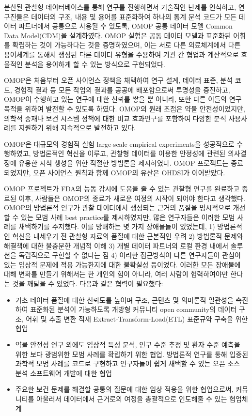 \documentclass[10.5pt]{book}
\providecommand{\tightlist}{%
  \setlength{\itemsep}{0pt}\setlength{\parskip}{0pt}}
\theoremstyle{definition}
\theoremstyle{definition}
\theoremstyle{definition}
\theoremstyle{remark}
\begin{document}
분산된 관찰형 데이터베이스를 통해 연구를 진행하면서 기술적인 난제를
인식하고, 연구진들은 데이터의 구조, 내용 및 용어를 표준화하여 하나의
통계 분석 코드가 모든 데이터 파트너에서 공통으로 사용될 수 있도록, OMOP
공통 데이터 모델 Common Data Model(CDM)을 설계하였다.
\citep{overhage2012cdm} OMOP 실험은 공통 데이터 모델과 표준화된 어휘를
확립하는 것이 가능하다는 것을 증명하였으며, 이는 서로 다른 의료체계에서
다른 용어체계를 통해서 생성된 다른 데이터 유형을 수용하여 기관 간 협업과
계산적으로 효율적인 분석을 용이하게 할 수 있는 방식으로 구현되었다.

OMOP은 처음부터 오픈 사이언스 정책을 채택하여 연구 설계, 데이터 표준,
분석 코드, 경험적 결과 등 모든 작업의 결과를 공공에 배포함으로써
투명성을 증진하고, OMOP이 수행하고 있는 연구에 대한 신뢰를 쌓을 뿐
아니라, 또한 다른 이들의 연구 목적을 위하여 발전할 수 있도록 하였다.
OMOP의 원래 초점은 약물 안전성이었지만, 의학적 중재나 보건 시스템 정책에
대한 비교 효과연구를 포함하여 다양한 분석 사용사례를 지원하기 위해
지속적으로 발전하고 있다.

OMOP은 대규모의 경험적 실험 large-scale empirical experiments을
성공적으로 수행하였고, \citep{ryan2012omop, ryan2013omop} 방법론적인
혁신을 이루고, \citep{schuemie_2014} 관찰형 데이터를 이용한 안정성에
관련된 의사결정에 유용한 지식 생성을 위한 적절한 방법론을 제시하였다.
\citep{madigan_2013, madigan2013design} OMOP 프로젝트는 종료되었지만,
오픈 사이언스 원칙과 함께 OMOP의 유산은 OHDSI가 이어받았다.

OMOP 프로젝트가 FDA의 능동 감시에 도움을 줄 수 있는 관찰형 연구를
완료하고 종료된 이후, 사람들은 OMOP의 종료가 새로운 여정의 시작이 되어야
한다고 생각했다. OMOP의 방법론적 연구가 관찰 데이터에서 생성되는 근거의
품질을 명시적으로 개선할 수 있는 모범 사례 best practice를 제시하였지만,
많은 연구자들은 이러한 모범 사례를 채택하기를 주저했다. 이를 방해하는 몇
가지 장애물들이 있었는데, 1) 방법론적인 혁신을 내세우기 전 관찰형 자료의
품질에 대한 근본적인 우려 2) 방법론적 문제와 해결책에 대한 불충분한
개념적 이해 3) 개별 데이터 파트너의 로컬 환경 내에서 솔루션을 독립적으로
구현할 수 없다는 점 4) 이러한 접근방식이 다른 연구자들이 관심이 있는
임상적 문제에 적용 가능한지에 대한 불확실성 등이었다. 이러한 모든
장애물에 대해 변화를 만들기 위해서는 한 개인의 힘이 아니라, 여러 사람이
협력하여야만 한다는 것을 깨달을 수 있었다. 다음과 같은 협력이 필요했다:

\begin{itemize}
\tightlist
\item
  기초 데이터 품질에 대한 신뢰도를 높이며 구조, 콘텐츠 및 의미론적
  일관성을 촉진하여 표준화된 분석이 가능하도록 개방형 커뮤니티 open
  community의 데이터 구조, 어휘 및 추출 변환 적재
  Extract-Transform-Load(ETL) 표준규약 구축을 위한 협업
\item
  약물 안전성 연구 외에도 임상적 특성 분석, 인구 수준 추정 및 환자 수준
  예측을 위한 보다 광범위한 모범 사례를 확립하기 위한 협업. 방법론적
  연구를 통해 입증된 과학적 모범 사례를 코드로 구현하고 연구자들이 쉽게
  채택할 수 있는 오픈 소스 분석 소프트웨어 개발에 대한 협업
\item
  주요한 보건 문제를 해결할 공통의 질문에 대한 임상 적용을 위한
  협업으로써, 커뮤니티를 아울러서 데이터에서 근거로의 여정을 총괄적으로
  인도해줄 수 있는 협업체계
\end{itemize}
\end{document}
